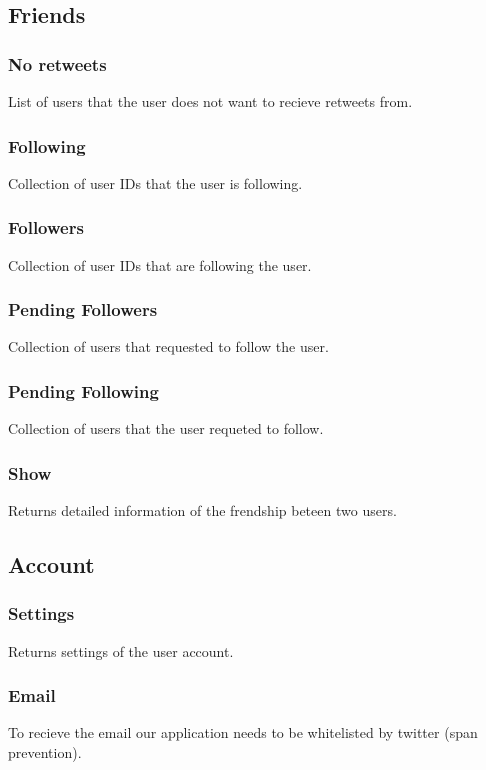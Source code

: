 \documentclass{article}
\begin{document}
	\subsection{Friends}
		\subsubsection{No retweets}
			List of users that the user does not want to recieve retweets from.

		\subsubsection{Following}
			Collection of user IDs that the user is following.

		\subsubsection{Followers}
			Collection of user IDs that are following the user.

		\subsubsection{Pending Followers}
			Collection of users that requested to follow the user.

		\subsubsection{Pending Following}
			Collection of users that the user requeted to follow.

		\subsubsection{Show}
			Returns detailed information of the frendship beteen two users.

	\subsection{Account}
		\subsubsection{Settings}
			Returns settings of the user account.

		\subsubsection{Email}
			To recieve the email our application needs to be whitelisted by twitter (span prevention).
\end{document}
